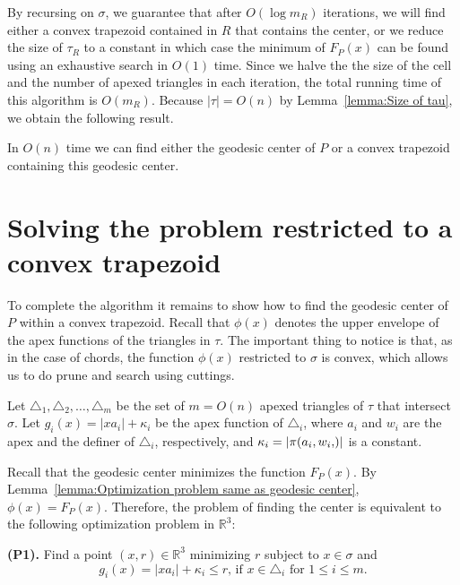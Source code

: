 \documentclass[a4paper,UKenglish]{lipics}
\newcommand{\F}[2]{\ensuremath{F_{\scriptscriptstyle #1}(#2)}}
\newcommand{\m}{\ensuremath{m_{\scriptscriptstyle R}}}
\newcommand{\g}[2]{\ensuremath{|\pi(#1, #2)|}}
\newcommand{\cell}{\ensuremath{\sigma}}
\begin{document}
By recursing on $\cell$, we guarantee that after $O(\log \m)$ iterations, we will find either a convex trapezoid contained in $R$ that contains the center, or we reduce the size of $\tau_R$ to a constant in which case the minimum of $\F{P}{x}$ can be found using an exhaustive search in $O(1)$ time. Since we halve the the size of the cell and the number of apexed triangles in each iteration, the total running time of this algorithm is $O(\m)$. 
Because $|\tau| = O(n)$ by Lemma~\ref{lemma:Size of tau}, we obtain the following result.

\begin{lemma}\label{lemma:Finding the convex trapezoid}
In $O(n)$ time we can find either the geodesic center of $P$ or a convex trapezoid containing this geodesic center.
\end{lemma}

\section{Solving the problem restricted to a convex trapezoid}\label{Section:Solving convex optimization poblem}
To complete the algorithm it remains to show how to find the geodesic center of $P$ within a convex trapezoid.
Recall that $\phi(x)$ denotes the upper envelope of the apex functions of the triangles in $\tau$.
The important thing to notice is that, as in the case of chords, the function $\phi(x)$ restricted to $\cell$ is convex, which allows us to do prune and search using cuttings.

Let $\triangle_{1}, \triangle_{2}, \ldots, \triangle_{m}$ be the set of $m= O(n)$ apexed triangles of $\tau$ that intersect $\cell$. Let $g_i(x) = |x a_i| + \kappa_i$ be the apex function of $\triangle_i$, where $a_i$ and $w_i$ are the apex and the definer of $\triangle_i$, respectively, and $\kappa_i = \g{a_i, w_i}$ is a constant.

Recall that the geodesic center minimizes the function $\F{P}{x}$.
By Lemma~\ref{lemma:Optimization problem same as geodesic center}, $\phi(x) = \F{P}{x}$. 
Therefore, the problem of finding the center is equivalent to the following optimization problem in $\mathbb{R}^3$:

\textbf{(P1).} Find a point $(x,r)\in \mathbb{R}^3$ minimizing $r$ subject to $x\in \cell$ and
$$\text{$g_i(x) = |x a_i| + \kappa_i \leq r$, if $x\in \triangle_{i}$ for $1\leq i \leq m$}.$$
\end{document}
